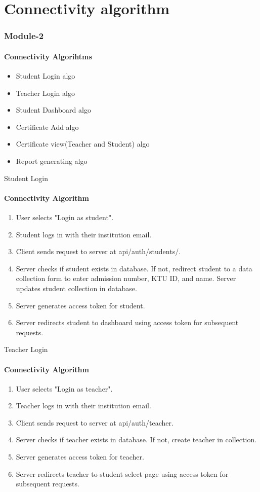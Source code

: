 \section{Connectivity algorithm}

\begin{frame}

 \frametitle{\centering Module-2}
    \framesubtitle{Connectivity Algorihtms}

        \begin{itemize}
            \item Student Login algo
            \item Teacher Login algo
            \item Student Dashboard algo
            \item Certificate Add algo
            \item Certificate view(Teacher and Student) algo
            \item Report generating algo
        \end{itemize}
 
\end{frame}


\begin{frame}{Student Login}
    \framesubtitle{Connectivity Algorithm}
        \begin{enumerate}
\item User selects "Login as student".
\item Student logs in with their institution email.
\item Client sends request to server at api/auth/students/.
\item Server checks if student exists in database. If not, redirect student to a data collection form to enter admission number, KTU ID, and name. Server updates student collection in database.
\item Server generates access token for student.
\item Server redirects student to dashboard using access token for subsequent requests.
        \end{enumerate}
    
\end{frame}

\begin{frame}{Teacher Login}
    \framesubtitle{Connectivity Algorithm}
        \begin{enumerate}            
\item User selects "Login as teacher".
\item Teacher logs in with their institution email.
\item Client sends request to server at api/auth/teacher.
\item Server checks if teacher exists in database. If not, create teacher in collection.
\item Server generates access token for teacher.
\item Server redirects teacher to student select page using access token for subsequent requests.
        \end{enumerate}
    
\end{frame}


